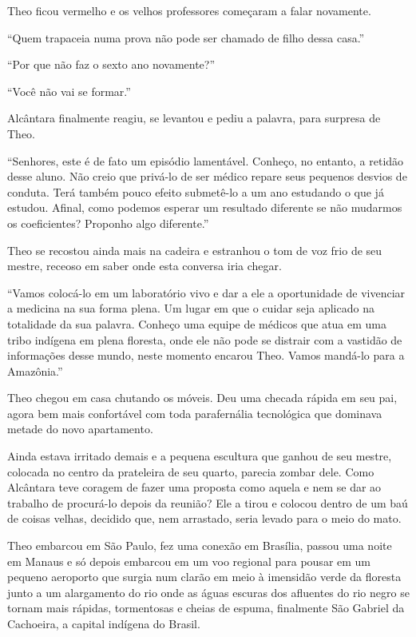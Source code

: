 Theo ficou vermelho e os velhos professores começaram a falar novamente.

``Quem trapaceia numa prova não pode ser chamado de filho dessa casa.''

``Por que não faz o sexto ano novamente?''

``Você não vai se formar.''

Alcântara finalmente reagiu, se levantou e pediu a palavra, para
surpresa de Theo.

``Senhores, este é de fato um episódio lamentável. Conheço, no entanto,
a retidão desse aluno. Não creio que privá-lo de ser médico repare seus
pequenos desvios de conduta. Terá também pouco efeito submetê-lo a um
ano estudando o que já estudou. Afinal, como podemos esperar um
resultado diferente se não mudarmos os coeficientes? Proponho algo
diferente.''

Theo se recostou ainda mais na cadeira e estranhou o tom de voz frio de
seu mestre, receoso em saber onde esta conversa iria chegar.

``Vamos colocá-lo em um laboratório vivo e dar a ele a oportunidade de
vivenciar a medicina na sua forma plena. Um lugar em que o cuidar seja
aplicado na totalidade da sua palavra. Conheço uma equipe de médicos que
atua em uma tribo indígena em plena floresta, onde ele não pode se
distrair com a vastidão de informações desse mundo, neste momento
encarou Theo. Vamos mandá-lo para a Amazônia.''

\asterisc

Theo chegou em casa chutando os móveis. Deu uma checada rápida em seu
pai, agora bem mais confortável com toda parafernália tecnológica que
dominava metade do novo apartamento.

Ainda estava irritado demais e a pequena escultura que ganhou de seu
mestre, colocada no centro da prateleira de seu quarto, parecia zombar
dele. Como Alcântara teve coragem de fazer uma proposta como aquela e
nem se dar ao trabalho de procurá-lo depois da reunião? Ele a tirou e
colocou dentro de um baú de coisas velhas, decidido que, nem arrastado,
seria levado para o meio do mato.

\asterisc

Theo embarcou em São Paulo, fez uma conexão em Brasília, passou uma
noite em Manaus e só depois embarcou em um voo regional para pousar em
um pequeno aeroporto que surgia num clarão em meio à imensidão verde da
floresta junto a um alargamento do rio onde as águas escuras dos
afluentes do rio negro se tornam mais rápidas, tormentosas e cheias de
espuma, finalmente São Gabriel da Cachoeira, a capital indígena do
Brasil.

